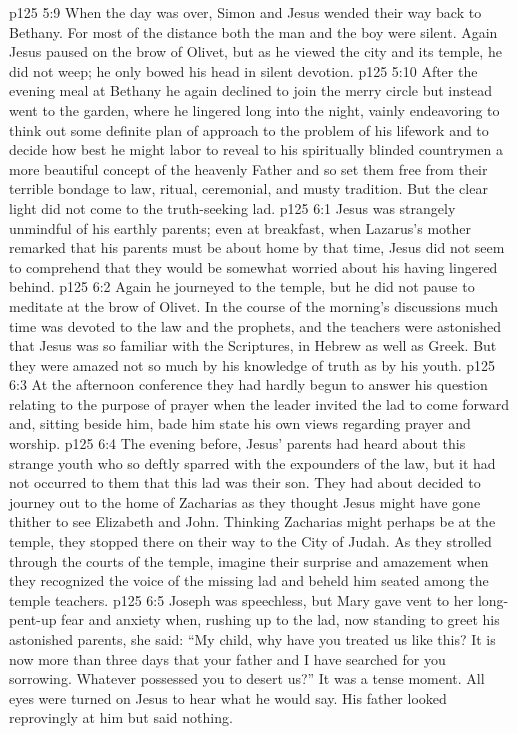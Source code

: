 \pc \vs p125 5:9 When the day was over, Simon and Jesus wended their way back to Bethany. For most of the distance both the man and the boy were silent. Again Jesus paused on the brow of Olivet, but as he viewed the city and its temple, he did not weep; he only bowed his head in silent devotion.
\vs p125 5:10 After the evening meal at Bethany he again declined to join the merry circle but instead went to the garden, where he lingered long into the night, vainly endeavoring to think out some definite plan of approach to the problem of his lifework and to decide how best he might labor to reveal to his spiritually blinded countrymen a more beautiful concept of the heavenly Father and so set them free from their terrible bondage to law, ritual, ceremonial, and musty tradition. But the clear light did not come to the truth\hyp{}seeking lad.
\vs p125 6:1 Jesus was strangely unmindful of his earthly parents; even at breakfast, when Lazarus’s mother remarked that his parents must be about home by that time, Jesus did not seem to comprehend that they would be somewhat worried about his having lingered behind.
\vs p125 6:2 Again he journeyed to the temple, but he did not pause to meditate at the brow of Olivet. In the course of the morning’s discussions much time was devoted to the law and the prophets, and the teachers were astonished that Jesus was so familiar with the Scriptures, in Hebrew as well as Greek. But they were amazed not so much by his knowledge of truth as by his youth.
\vs p125 6:3 At the afternoon conference they had hardly begun to answer his question relating to the purpose of prayer when the leader invited the lad to come forward and, sitting beside him, bade him state his own views regarding prayer and worship.
\pc \vs p125 6:4 The evening before, Jesus’ parents had heard about this strange youth who so deftly sparred with the expounders of the law, but it had not occurred to them that this lad was their son. They had about decided to journey out to the home of Zacharias as they thought Jesus might have gone thither to see Elizabeth and John. Thinking Zacharias might perhaps be at the temple, they stopped there on their way to the City of Judah. As they strolled through the courts of the temple, imagine their surprise and amazement when they recognized the voice of the missing lad and beheld him seated among the temple teachers.
\vs p125 6:5 Joseph was speechless, but Mary gave vent to her long\hyp{}pent\hyp{}up fear and anxiety when, rushing up to the lad, now standing to greet his astonished parents, she said: “My child, why have you treated us like this? It is now more than three days that your father and I have searched for you sorrowing. Whatever possessed you to desert us?” It was a tense moment. All eyes were turned on Jesus to hear what he would say. His father looked reprovingly at him but said nothing.
